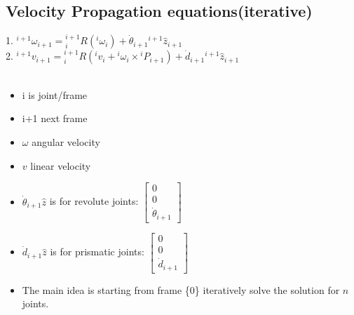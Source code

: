 \documentclass{article}
\begin{document}

\subsection{Velocity Propagation equations(iterative)}
1. ${}^{i+1}\omega_{i+1}={}^{i+1}_iR({}^i \omega_i) + \dot{\theta}_{i+1} {}^{i+1}\hat{z}_{i+1}$\\
2. ${}^{i+1}v_{i+1}={}^{i+1}_iR({}^i v_i + {}^i \omega_i \times {}^i P_{i+1}) + \dot{d}_{i+1} {}^{i+1}\hat{z}_{i+1}$\\\\
\begin{itemize}
    \item i is joint/frame
    \item i+1 next frame
    \item $\omega$ angular velocity
    \item $v$ linear velocity
    \item $\dot{\theta}_{i+1} \hat{z}$ is for revolute joints: $\begin{bmatrix}
        0\\
        0\\
        \dot{\theta}_{i+1}
    \end{bmatrix}$
    \item $\dot{d}_{i+1} \hat{z}$ is for prismatic joints: $\begin{bmatrix}
        0\\
        0\\
        \dot{d}_{i+1}
    \end{bmatrix}$
    \item The main idea is starting from frame \{0\} iteratively solve the solution for $n$ joints. 
\end{itemize}
\end{document}
